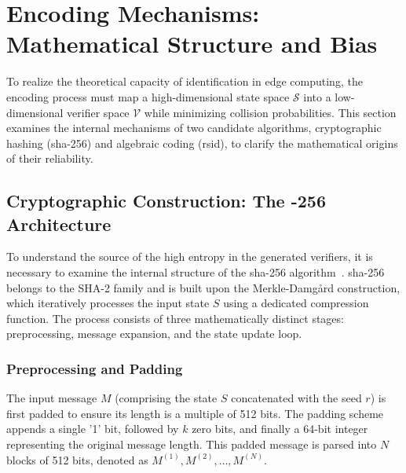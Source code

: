 \section{Encoding Mechanisms: Mathematical Structure and Bias}
\label{sec:encoding_mechanisms}

To realize the theoretical capacity of identification in edge computing, the encoding process must map a high-dimensional state space $\mathcal{S}$ into a low-dimensional verifier space $\mathcal{V}$ while minimizing collision probabilities. This section examines the internal mechanisms of two candidate algorithms, cryptographic hashing (\gls{sha}-256) and algebraic coding (\gls{rsid}), to clarify the mathematical origins of their reliability.

\subsection[Cryptographic Construction: The SHA-256 Architecture]{Cryptographic Construction: The -256 Architecture}
\label{subsec:sha256_structure}

To understand the source of the high entropy in the generated verifiers, it is necessary to examine the internal structure of the \gls{sha}-256 algorithm~\cite{nist2015secure}. \gls{sha}-256 belongs to the SHA-2 family and is built upon the Merkle-Damgård construction, which iteratively processes the input state $S$ using a dedicated compression function. The process consists of three mathematically distinct stages: preprocessing, message expansion, and the state update loop.

\subsubsection{Preprocessing and Padding}
The input message $M$ (comprising the state $S$ concatenated with the seed $r$) is first padded to ensure its length is a multiple of 512 bits. The padding scheme appends a single '1' bit, followed by $k$ zero bits, and finally a 64-bit integer representing the original message length. This padded message is parsed into $N$ blocks of 512 bits, denoted as $M^{(1)}, M^{(2)}, \dots, M^{(N)}$.

